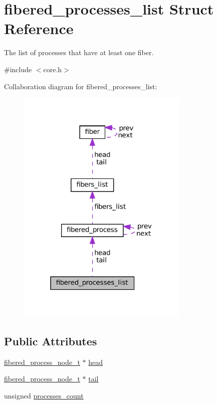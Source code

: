 \hypertarget{structfibered__processes__list}{}\section{fibered\+\_\+processes\+\_\+list Struct Reference}
\label{structfibered__processes__list}


The list of processes that have at least one fiber.  




{\ttfamily \#include $<$core.\+h$>$}



Collaboration diagram for fibered\+\_\+processes\+\_\+list\+:
\nopagebreak
\begin{figure}[H]
\begin{center}
\leavevmode
\includegraphics[width=232pt]{structfibered__processes__list__coll__graph}
\end{center}
\end{figure}
\subsection*{Public Attributes}
\begin{DoxyCompactItemize}
\item 
\mbox{\hyperlink{core_8h_aa16708c717e33e5e95614cd1e4ca7b2b}{fibered\+\_\+process\+\_\+node\+\_\+t}} $\ast$ \mbox{\hyperlink{structfibered__processes__list_a460c3f34099c7589c25c383add98650b}{head}}
\item 
\mbox{\hyperlink{core_8h_aa16708c717e33e5e95614cd1e4ca7b2b}{fibered\+\_\+process\+\_\+node\+\_\+t}} $\ast$ \mbox{\hyperlink{structfibered__processes__list_a423b95d461fa440ede7dd019b8c94aa6}{tail}}
\item 
unsigned \mbox{\hyperlink{structfibered__processes__list_a357ed70a414391e2cde4cf1c6062b6ce}{processes\+\_\+count}}
\end{DoxyCompactItemize}


